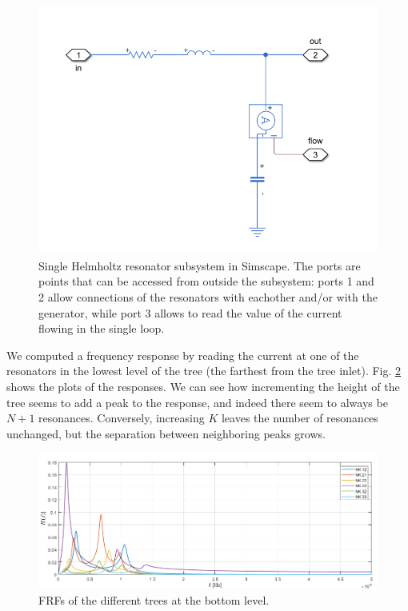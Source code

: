\documentclass[a4paper]{article}
\begin{document}
\begin{figure}[h!]
	\centering
	\includegraphics[width=0.7\linewidth]{sims.png}
	\caption{Single Helmholtz resonator subsystem in Simscape. The ports are points that can be accessed from outside the subsystem: ports 1 and 2 allow connections of the resonators with eachother and/or with the generator, while port 3 allows to read the value of the current flowing in the single loop.}
	\label{fig:sims}
\end{figure}

We computed a frequency response by reading the current at one of the resonators in the lowest level of the tree (the farthest from the tree inlet). Fig. \ref{fig:es2} shows the plots of the responses. We can see how incrementing the height of the tree seems to add a peak to the response, and indeed there seem to always be $N+1$ resonances. Conversely, increasing $K$ leaves the number of resonances unchanged, but the separation between neighboring peaks grows.



\begin{figure}[h!]
	\centering
	\includegraphics[width=0.7\linewidth]{es2.png}
	\caption{FRFs of the different trees at the bottom level.}
	\label{fig:es2}
\end{figure}
\end{document}
